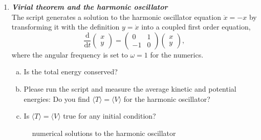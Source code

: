 \documentclass[a4paper,12pt]{article}
\newcommand{\question}[1]{\textbf{\textit{#1}}}
\newcommand{\dd}{\mathrm{d}}
\newcommand{\bra}{\langle}
\newcommand{\ket}{\rangle}
\begin{document}
\begin{enumerate}

\item \question{Virial theorem and the harmonic oscillator}\\
The script  generates a solution to the harmonic oscillator equation $\ddot{x} = -x$ by transforming it with the definition $y=\dot{x}$ into a coupled first order equation,
\begin{equation}
\frac{\dd}{\dd t}
\left(
\begin{array}{c}
x\\
y
\end{array}
\right)
=
\left(
\begin{array}{cc}
0 & 1\\
-1 & 0
\end{array}
\right)
\left(
\begin{array}{c}
x\\
y
\end{array}
\right),
\end{equation}
where the angular frequency is set to $\omega=1$ for the numerics.
\begin{enumerate}[(a)]
\item{Is the total energy conserved?}
\item{Please run the script and measure the average kinetic and potential energies: Do you find $\bra T\ket = \bra V\ket$ for the harmonic oscillator?}
\item{Is $\bra T\ket = \bra V\ket$ true for any initial condition?}
\end{enumerate}

\begin{figure}[h]
\begin{center}
\caption{numerical solutions to the harmonic oscillator}
\end{center}
\end{figure}



\end{enumerate}
\end{document}

